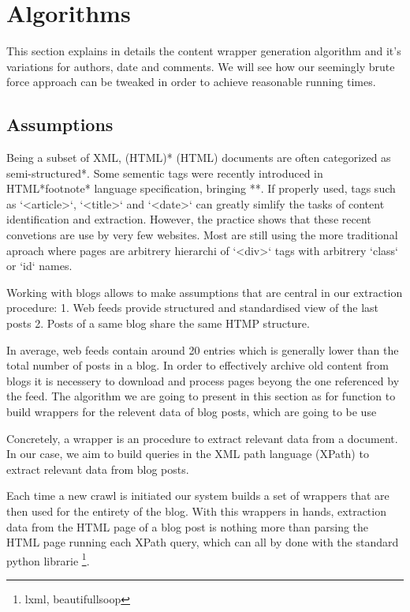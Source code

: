 \section{Algorithms}

This section explains in details the content wrapper generation algorithm and it's variations for authors, date and comments. We will see how our seemingly brute force approach can be tweaked in order to achieve reasonable running times.

\subsection{Assumptions}
Being a subset of XML, (HTML)* (HTML) documents are often categorized as semi-structured*. Some sementic tags were recently introduced in HTML*footnote* language specification, bringing **. If properly used, tags such as `<article>`, `<title>` and `<date>` can greatly simlify the tasks of content identification and extraction. However, the practice shows that these recent convetions are use by very few websites. Most are still using the more traditional aproach where pages are arbitrery hierarchi of `<div>` tags with arbitrery `class` or `id` names.

Working with blogs allows to make assumptions that are central in our extraction procedure:
1. Web feeds provide structured and standardised view of the last posts
2. Posts of a same blog share the same HTMP structure.

In average, web feeds contain around 20 entries \cite{french paper} which is generally lower than the total number of posts in a blog. In order to effectively archive old content from blogs it is necessery to download and process pages beyong the one referenced by the feed. The algorithm we are going to present in this section as for function to build wrappers for the relevent data of blog posts, which are going to be use 


Concretely, a wrapper is an procedure to extract relevant data from a document. In our case, we aim to build queries in the XML path language (XPath) to extract relevant data from blog posts.

Each time a new crawl is initiated our system builds a set of wrappers that are then used for the entirety of the blog. With this wrappers in hands, extraction data from the HTML page of a blog post is nothing more than parsing the HTML page running each XPath query, which can all by done with the standard python librarie \footnote{lxml, beautifullsoop}.

